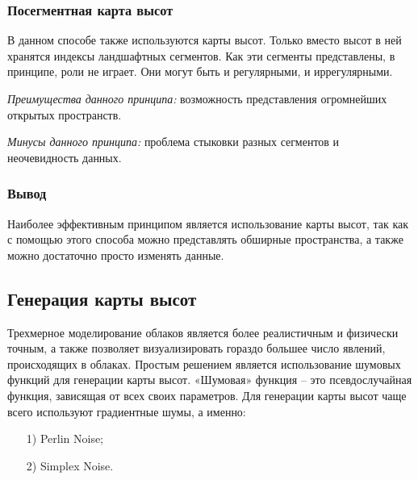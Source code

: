 \documentclass[14pt, a4paper]{extarticle}
\begin{document}
\subsubsection{Посегментная карта высот}
В данном способе также используются карты высот. Только вместо высот в ней хранятся индексы ландшафтных сегментов. Как эти сегменты представлены, в принципе, роли не играет. Они могут быть и регулярными, и иррегулярными.\par
\textit{Преимущества данного принципа:} возможность представления огромнейших открытых пространств.\par
\textit{Минусы данного принципа:} проблема стыковки разных сегментов и неочевидность данных.
\subsubsection{Вывод}
Наиболее эффективным принципом является использование карты высот, так как с помощью этого способа можно представлять обширные пространства, а также можно достаточно просто изменять данные.

\subsection{Генерация карты высот}
Трехмерное моделирование облаков является более реалистичным и физически точным, а также позволяет визуализировать гораздо большее число явлений, происходящих в облаках. Простым решением является использование шумовых функций для генерации карты высот. «Шумовая» функция – это псевдослучайная функция, зависящая от всех своих параметров. Для генерации карты высот чаще всего используют градиентные шумы, а именно:
\begin{enumerate}
	\item[1)] Perlin Noise;
	\item[2)] Simplex Noise.
\end{enumerate}
\end{document}
